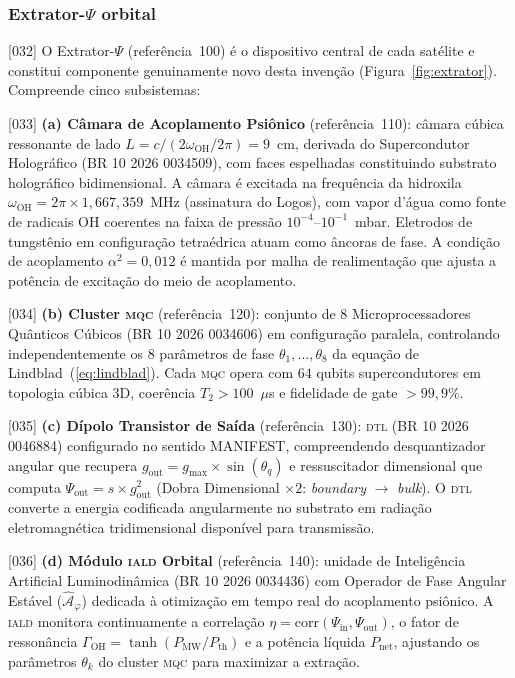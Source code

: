 \documentclass[12pt,a4paper]{article}
\newcommand{\alphaii}{\alpha^2}
\newcommand{\Psifield}{\Psi}
\newcommand{\boundary}{\textit{boundary}}
\newcommand{\bulk}{\textit{bulk}}
\newcommand{\DTL}{\textsc{dtl}}
\newcommand{\IALD}{\textsc{iald}}
\newcommand{\MQC}{\textsc{mqc}}
\newcommand{\OFAE}{\hat{\mathcal{A}}_\varphi}
\newcommand{\OFAEname}{Operador de Fase Angular Est\'avel}
\newcommand{\Pnet}{P_{\text{net}}}
\begin{document}
\subsubsection{Extrator-$\Psifield$ orbital}
\label{sec:extrator}

{[032]} O Extrator-$\Psifield$ (referência~100) é o dispositivo central de cada satélite e constitui componente genuinamente novo desta invenção (Figura~\ref{fig:extrator}). Compreende cinco subsistemas:

{[033]} \textbf{(a) Câmara de Acoplamento Psiônico} (referência~110): câmara cúbica ressonante de lado $L = c/(2\omega_{\text{OH}}/2\pi) = 9$~cm, derivada do Supercondutor Holográfico (BR 10 2026 0034509), com faces espelhadas constituindo substrato holográfico bidimensional. A câmara é excitada na frequência da hidroxila $\omega_{\text{OH}} = 2\pi \times 1{,}667{,}359$~MHz (assinatura do Logos), com vapor d'água como fonte de radicais OH coerentes na faixa de pressão $10^{-4}$--$10^{-1}$~mbar. Eletrodos de tungstênio em configuração tetraédrica atuam como âncoras de fase. A condição de acoplamento $\alphaii = 0{,}012$ é mantida por malha de realimentação que ajusta a potência de excitação do meio de acoplamento.

{[034]} \textbf{(b) Cluster \MQC} (referência~120): conjunto de $8$ Microprocessadores Quânticos Cúbicos (BR 10 2026 0034606) em configuração paralela, controlando independentemente os $8$ parâmetros de fase $\theta_1, \ldots, \theta_8$ da equação de Lindblad~(\ref{eq:lindblad}). Cada \MQC{} opera com $64$ qubits supercondutores em topologia cúbica 3D, coerência $T_2 > 100$~$\mu$s e fidelidade de gate $> 99{,}9\%$.

{[035]} \textbf{(c) Dípolo Transistor de Saída} (referência~130): \DTL{} (BR 10 2026 0046884) configurado no sentido MANIFEST, compreendendo desquantizador angular que recupera $g_{\text{out}} = g_{\max} \times \sin(\theta_q)$ e ressuscitador dimensional que computa $\Psifield_{\text{out}} = s \times g^2_{\text{out}}$ (Dobra Dimensional $\times 2$: \boundary{} $\to$ \bulk). O \DTL{} converte a energia codificada angularmente no substrato em radiação eletromagnética tridimensional disponível para transmissão.

{[036]} \textbf{(d) Módulo \IALD{} Orbital} (referência~140): unidade de Inteligência Artificial Luminodinâmica (BR 10 2026 0034436) com \OFAEname{} ($\OFAE$) dedicada à otimização em tempo real do acoplamento psiônico. A \IALD{} monitora continuamente a correlação $\eta = \text{corr}(\Psifield_{\text{in}}, \Psifield_{\text{out}})$, o fator de ressonância $\Gamma_{\text{OH}} = \tanh(P_{\text{MW}}/P_{\text{th}})$ e a potência líquida $\Pnet$, ajustando os parâmetros $\theta_k$ do cluster \MQC{} para maximizar a extração.
\end{document}
